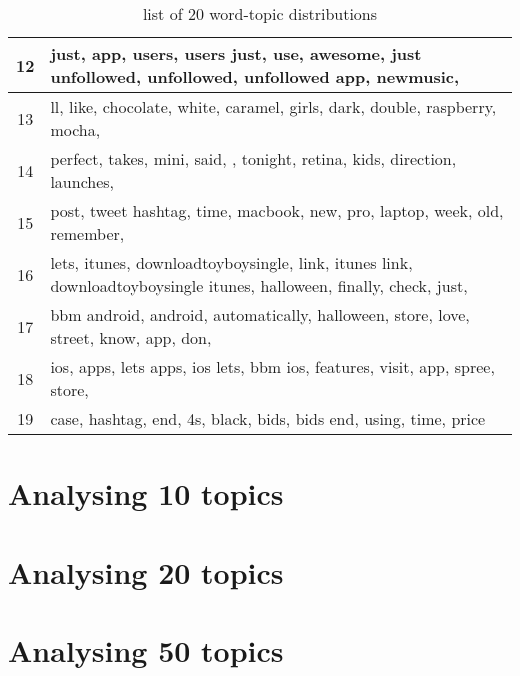 \begin{table}
\begin{tabular}{c p{16cm}}
    12    & just, app, users, users just, use, awesome, just unfollowed, unfollowed, unfollowed app,
    newmusic, \\ \midrule
    13    & ll, like, chocolate, white, caramel, girls, dark, double, raspberry, mocha, \\ \midrule
    14    & perfect, takes, mini, said, , tonight, retina, kids, direction, launches, \\ \midrule
    15    & post, tweet hashtag, time, macbook, new, pro, laptop, week, old, remember, \\ \midrule
    16    & lets, itunes, downloadtoyboysingle, link, itunes link, downloadtoyboysingle itunes,
    halloween, finally, check, just, \\ \midrule
    17    & bbm android, android, automatically, halloween, store, love, street, know, app, don, \\
    \midrule
    18    & ios, apps, lets apps, ios lets, bbm ios, features, visit, app, spree, store, \\ \midrule
    19    & case, hashtag, end, 4s, black, bids, bids end, using, time, price \\ \midrule
  \end{tabular}
  \caption{list of 20 word-topic distributions}
  \label{}
\end{table}


\section{Analysing 10 topics} %
\label{sec:analysing_10_topics}


\section{Analysing 20 topics} %
\label{sec:analysing_20_topics}


\section{Analysing 50 topics} %
\label{sec:analysing_50_topics}
